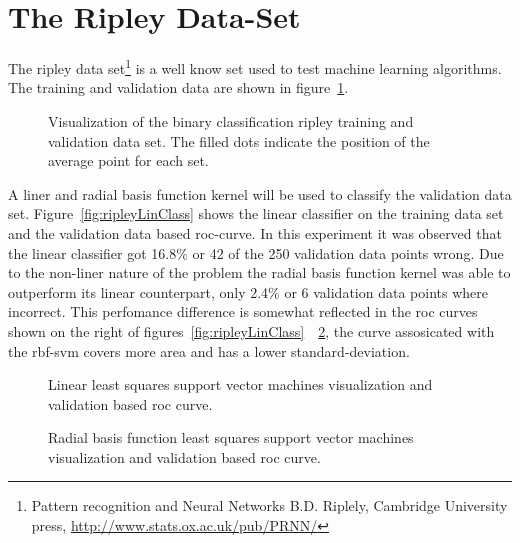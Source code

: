 \section{The Ripley Data-Set}
The ripley data set\footnote{Pattern recognition and Neural Networks B.D. Riplely, Cambridge University press, \url{http://www.stats.ox.ac.uk/pub/PRNN/}} is a well know set used to test machine learning algorithms. The training and validation data are shown in figure~\ref{fig:ripleyVisual}. 
\begin{figure}
\centering
\tikzset{mark size=1}


\caption{Visualization of the binary classification ripley training and validation data set. The filled dots indicate the position of the average point for each set.}
\label{fig:ripleyVisual}
\end{figure}
A liner and radial basis function kernel will be used to classify the validation data set. Figure~\ref{fig:ripleyLinClass} shows the linear classifier on the training data set and the validation data based roc-curve. In this experiment it was observed that the linear classifier got 16.8\% or 42 of the 250 validation data points wrong. Due to the non-liner nature of the problem the radial basis function kernel was able to outperform its linear counterpart, only 2.4\% or 6 validation data points where incorrect. This perfomance difference is somewhat reflected in the roc curves shown on the right of figures~\ref{fig:ripleyLinClass}~~\ref{fig:ripleyClass}, the curve assosicated with the rbf-svm covers more area and has a lower standard-deviation. 

\begin{figure}
\centering
\tikzset{mark size=1}


\caption{Linear least squares support vector machines visualization and validation based roc curve.}
\label{fig:ripleyLinClass}


\caption{Radial basis function least squares support vector machines visualization and validation based roc curve.}
\label{fig:ripleyClass}
\end{figure}

